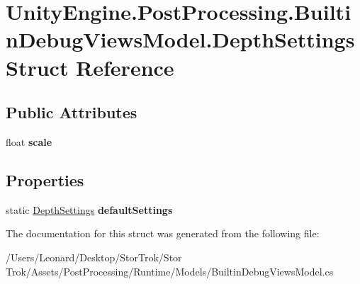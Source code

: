 \hypertarget{struct_unity_engine_1_1_post_processing_1_1_builtin_debug_views_model_1_1_depth_settings}{}\section{Unity\+Engine.\+Post\+Processing.\+Builtin\+Debug\+Views\+Model.\+Depth\+Settings Struct Reference}
\label{struct_unity_engine_1_1_post_processing_1_1_builtin_debug_views_model_1_1_depth_settings}
\subsection*{Public Attributes}
\begin{DoxyCompactItemize}
\item 
\mbox{\label{struct_unity_engine_1_1_post_processing_1_1_builtin_debug_views_model_1_1_depth_settings_a42df42d4c46463f482eb4221558d70f6}} 
float {\bfseries scale}
\end{DoxyCompactItemize}
\subsection*{Properties}
\begin{DoxyCompactItemize}
\item 
\mbox{\label{struct_unity_engine_1_1_post_processing_1_1_builtin_debug_views_model_1_1_depth_settings_a1270abe980a84e80675fad750ff67b0d}} 
static \hyperlink{struct_unity_engine_1_1_post_processing_1_1_builtin_debug_views_model_1_1_depth_settings}{Depth\+Settings} {\bfseries default\+Settings}
\end{DoxyCompactItemize}


The documentation for this struct was generated from the following file\+:\begin{DoxyCompactItemize}
\item 
/\+Users/\+Leonard/\+Desktop/\+Stor\+Trok/\+Stor Trok/\+Assets/\+Post\+Processing/\+Runtime/\+Models/Builtin\+Debug\+Views\+Model.\+cs\end{DoxyCompactItemize}
